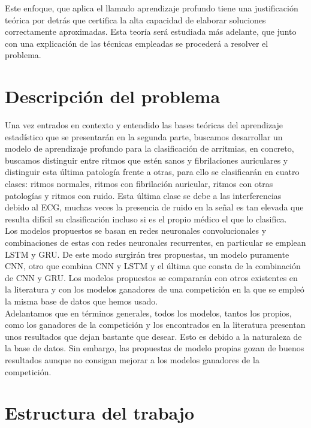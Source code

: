     Este enfoque, que aplica el llamado aprendizaje profundo tiene una justificación teórica por detrás que certifica la alta capacidad de elaborar soluciones correctamente aproximadas. Esta teoría será estudiada más adelante, que junto con una explicación de las técnicas empleadas se procederá a resolver el problema. \\
    
    


\section{Descripción del problema}
    
    Una vez entrados en contexto y entendido las bases teóricas del aprendizaje estadístico que se presentarán en la segunda parte, buscamos desarrollar un modelo de aprendizaje profundo para la clasificación de arritmias, en concreto, buscamos distinguir entre ritmos que estén sanos y fibrilaciones auriculares y distinguir esta última patología frente a otras, para ello se clasificarán en cuatro clases: ritmos normales, ritmos con fibrilación auricular, ritmos con otras patologías y ritmos con ruido. Esta última clase se debe a las interferencias debido al ECG, muchas veces la presencia de ruido en la señal es tan elevada que resulta difícil su clasificación incluso si es el propio médico el que lo clasifica. \\
    
    Los modelos propuestos se basan en redes neuronales convolucionales y combinaciones de estas con redes neuronales recurrentes, en particular se emplean LSTM y GRU. De este modo surgirán tres propuestas, un modelo puramente CNN, otro que combina CNN y LSTM y el última que consta de la combinación de CNN y GRU. Los modelos propuestos se compararán con otros existentes en la literatura y con los modelos ganadores de una competición en la que se empleó la misma base de datos que hemos usado. \\
    
    Adelantamos que en términos generales, todos los modelos, tantos los propios, como los ganadores de la competición y los encontrados en la literatura presentan unos resultados que dejan bastante que desear. Esto es debido a la naturaleza de la base de datos. Sin embargo, las propuestas de modelo propias gozan de buenos resultados aunque no consigan mejorar a los modelos ganadores de la competición. \\
    
\section{Estructura del trabajo}

